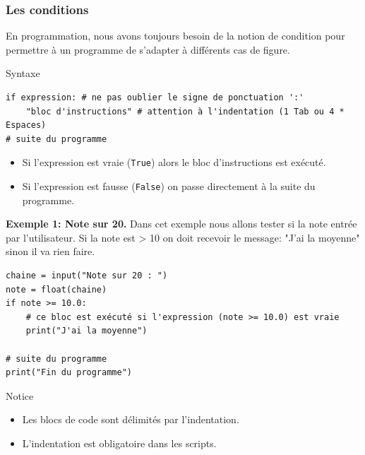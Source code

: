 \documentclass{beamer}
\begin{document}
\begin{frame}
\frametitle{Les conditions}


En programmation, nous avons toujours besoin de la notion de condition pour permettre à un programme de s'adapter à différents cas de figure.

\begin{block}{Syntaxe }

\begin{verbatim}
if expression: # ne pas oublier le signe de ponctuation ':'
    "bloc d'instructions" # attention à l'indentation (1 Tab ou 4 * Espaces)
# suite du programme
\end{verbatim}
\begin{itemize}
\item Si l'expression est vraie (\texttt{True}) alors le bloc d'instructions est exécuté.

\item Si l'expression est fausse (\texttt{False}) on passe directement à la suite du programme.
\end{itemize}

\noindent
\end{block}



\end{frame}

\begin{frame}

\noindent\textbf{Exemple 1: Note sur 20.}
Dans cet exemple nous allons tester si la note entrée par l'utilisateur. Si la note est > 10 on doit recevoir le message: "J'ai la moyenne" sinon il va rien faire.
\begin{verbatim}
chaine = input("Note sur 20 : ")
note = float(chaine)
if note >= 10.0:
    # ce bloc est exécuté si l'expression (note >= 10.0) est vraie
    print("J'ai la moyenne")

# suite du programme
print("Fin du programme")
\end{verbatim}

\begin{block}{Notice}
\begin{itemize}
\item Les blocs de code sont délimités par l'indentation.

\item L'indentation est obligatoire dans les scripts.
\end{itemize}

\noindent
\end{block}
\end{frame}
\end{document}
